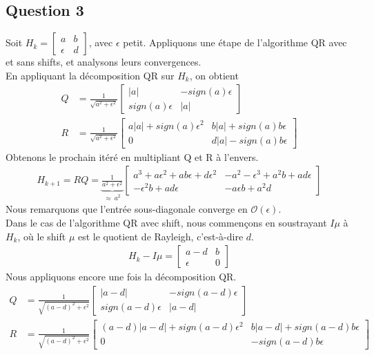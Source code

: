 \documentclass[11pt]{article}
\begin{document}
\subsection*{Question 3}
Soit $H_k = \left[\begin{array}{cc} a & b\\ \epsilon & d \end{array}\right]$, avec $\epsilon$ petit. Appliquons une étape de l'algorithme QR avec et sans shifts, et analysons leurs convergences.\\
En appliquant la décomposition QR sur $H_k$, on obtient
\begin{align*}
	Q &= \frac{1}{\sqrt{a^2+\epsilon^2}}\left[\begin{array}{cc}
		|a| & -sign(a)\epsilon\\
		sign(a)\epsilon & |a|
	\end{array}\right]\\
	R &= \frac{1}{\sqrt{a^2+\epsilon^2}}\left[\begin{array}{cc}
		a|a|+sign(a)\epsilon^2 & b|a|+sign(a)b\epsilon\\
		0 & d|a|-sign(a)b\epsilon
	\end{array}\right]
\end{align*}
Obtenons le prochain itéré en multipliant Q et R à l'envers.
\begin{align*}
	H_{k+1} = RQ = \underbrace{\frac{1}{a^2+\epsilon^2}}_{\approx ~a^2}
	\left[
		\begin{array}{cc}
			a^3+a\epsilon^2+ab\epsilon+d\epsilon^2 & -a^2-\epsilon^3+a^2b+ad\epsilon\\
			-\epsilon^2b+ad\epsilon & -a\epsilon b+a^2d
		\end{array}
	\right]
\end{align*}
Nous remarquons que l'entrée sous-diagonale converge en $\mathcal{O}(\epsilon)$.\\
Dans le cas de l'algorithme QR avec shift, nous commençons en soustrayant $I\mu$ à $H_k$, où le shift $\mu$ est le quotient de Rayleigh, c'est-à-dire $d$.
\begin{align*}
	H_k - I\mu = \left[\begin{array}{cc}
		a-d & b\\
		\epsilon & 0
	\end{array}\right]
\end{align*}
Nous appliquons encore une fois la décomposition QR.
\begin{align*}
	Q &= \frac{1}{\sqrt{(a-d)^2+\epsilon^2}}\left[\begin{array}{cc}
		|a-d| & -sign(a-d)\epsilon\\
		sign(a-d)\epsilon & |a-d|
	\end{array}\right]\\
	R &= \frac{1}{\sqrt{(a-d)^2+\epsilon^2}}\left[\begin{array}{cc}
		(a-d)|a-d|+sign(a-d)\epsilon^2 & b|a-d|+sign(a-d)b\epsilon\\
		0 & -sign(a-d)b\epsilon
	\end{array}\right]
\end{align*}
\end{document}
